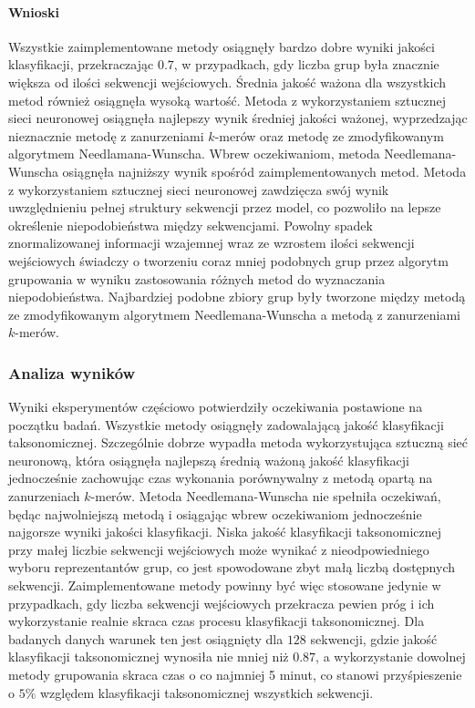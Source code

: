             \paragraph{Wnioski}
                Wszystkie zaimplementowane metody osiągnęły bardzo dobre wyniki jakości klasyfikacji, przekraczając $0.7$, w przypadkach, gdy liczba grup była znacznie większa od ilości sekwencji wejściowych. Średnia jakość ważona dla wszystkich metod również osiągnęła wysoką wartość.
                Metoda z wykorzystaniem sztucznej sieci neuronowej osiągnęła najlepszy wynik średniej jakości ważonej, wyprzedzając nieznacznie metodę z zanurzeniami $k$-merów oraz metodę ze zmodyfikowanym algorytmem Needlamana-Wunscha. Wbrew oczekiwaniom, metoda Needlemana-Wunscha osiągnęła najniższy wynik spośród zaimplementowanych metod.
                Metoda z wykorzystaniem sztucznej sieci neuronowej zawdzięcza swój wynik uwzględnieniu pełnej struktury sekwencji przez model, co pozwoliło na lepsze określenie niepodobieństwa między sekwencjami.
                Powolny spadek znormalizowanej informacji wzajemnej wraz ze wzrostem ilości sekwencji wejściowych świadczy o tworzeniu coraz mniej podobnych grup przez algorytm grupowania w wyniku zastosowania różnych metod do wyznaczania niepodobieństwa. Najbardziej podobne zbiory grup były tworzone między metodą ze zmodyfikowanym algorytmem Needlemana-Wunscha a metodą z zanurzeniami $k$-merów.

        \subsubsection{Analiza wyników}

            Wyniki eksperymentów częściowo potwierdziły oczekiwania postawione na początku badań. Wszystkie metody osiągnęły zadowalającą jakość klasyfikacji taksonomicznej. Szczególnie dobrze wypadła metoda wykorzystująca sztuczną sieć neuronową, która osiągnęła najlepszą średnią ważoną jakość klasyfikacji jednocześnie zachowując czas wykonania porównywalny z metodą opartą na zanurzeniach $k$-merów. Metoda Needlemana-Wunscha nie spełniła oczekiwań, będąc najwolniejszą metodą i osiągając wbrew oczekiwaniom jednocześnie najgorsze wyniki jakości klasyfikacji. Niska jakość klasyfikacji taksonomicznej przy małej liczbie sekwencji wejściowych może wynikać z nieodpowiedniego wyboru reprezentantów grup, co jest spowodowane zbyt małą liczbą dostępnych sekwencji. Zaimplementowane metody powinny być więc stosowane jedynie w przypadkach, gdy liczba sekwencji wejściowych przekracza pewien próg i ich wykorzystanie realnie skraca czas procesu klasyfikacji taksonomicznej. Dla badanych danych warunek ten jest osiągnięty dla $128$ sekwencji, gdzie jakość klasyfikacji taksonomicznej wynosiła nie mniej niż $0.87$, a wykorzystanie dowolnej metody grupowania skraca czas o co najmniej 5 minut, co stanowi przyśpieszenie o $5\%$ względem klasyfikacji taksonomicznej wszystkich sekwencji.
